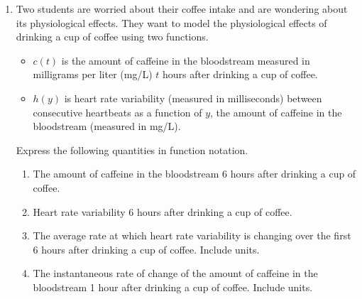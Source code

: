 \documentclass{article}
\begin{document}
\begin{enumerate}
\begin{enumerate}
    \item Determine where $f$ is decreasing. Represent your answer using interval notation.
    \pspace{\vfill}
    
    \item Determine whether $f$ has any turning points. If it does, write the $x$-values where they occur.
    \pspace{\vfill}

    \newpage
    
    \item Determine where $f$ is concave up. Represent your answer using interval notation.
    \pspace{\vfill}
    
    \item Determine where $f$ is concave down. Represent your answer using interval notation.
    \pspace{\vfill}
    \item Determine whether $f$ has any inflection points. If it does, write the $x$-values where they occur.
    \pspace{\vfill}
    \item Describe a possible graph of $f$. Include the information from previous parts to describe its increasing/decreasing and concavity behavior, as well as any known points.
    \item Check that your description in part (f) is consistent with your answers to parts (a)-(e) and what you know about the function. \textit{(Nothing to write here.)}
    
\end{enumerate}
\newpage
\item Two students are worried about their coffee intake and are wondering about its physiological effects. They want to model the physiological effects of drinking a cup of coffee using two functions.
\begin{itemize}
    \item $c(t)$ is the amount of caffeine in the bloodstream measured in milligrams per liter (mg/L) $t$ hours after drinking a cup of coffee.
    \item $h(y)$ is heart rate variability (measured in milliseconds) between consecutive heartbeats as a function of $y$, the amount of caffeine in the bloodstream (measured in mg/L).
\end{itemize}
Express the following quantities in function notation.
\begin{enumerate}
    \item The amount of caffeine in the bloodstream 6 hours after drinking a cup of coffee.
    \pspace{\vfill}
    \item Heart rate variability 6 hours after drinking a cup of coffee.
    \pspace{\vfill}
    \item The average rate at which heart rate variability is changing over the first 6 hours after drinking a cup of coffee. Include units.
    \pspace{\vfill}
    \item The instantaneous rate of change of the amount of caffeine in the bloodstream 1 hour after drinking a cup of coffee. Include units.
    \pspace{\vfill}
\end{enumerate}




\end{enumerate}
\end{document}
